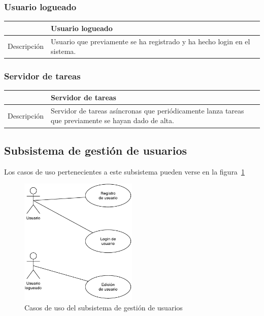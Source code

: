 \subsubsection{Usuario logueado}

\begin{center}
  \centering
  \begin{tabularx}{\textwidth}{|c|X|}
    \hline
     & Usuario logueado \\

    \hline

    Descripción & Usuario que previamente se ha registrado y ha hecho login en el sistema. \\

    \hline
  \end{tabularx}
\end{center}

\subsubsection{Servidor de tareas}

\begin{center}
  \centering
  \begin{tabularx}{\textwidth}{|c|X|}
    \hline
     & Servidor de tareas \\

    \hline

    Descripción & Servidor de tareas asíncronas que periódicamente lanza tareas que previamente se hayan dado de alta. \\

    \hline
  \end{tabularx}
\end{center}

\subsection{Subsistema de gestión de usuarios}

Los casos de uso pertenecientes a este subsistema pueden verse en la
figura~\ref{fig:subsistema-usuarios}

\begin{figure}[hp]
  \centering
  \includegraphics[width=0.5\textwidth]{4_analisis/diagrama_subsistema_gestion_usuarios}
  \caption{Casos de uso del subsistema de gestión de usuarios}
  \label{fig:subsistema-usuarios}
\end{figure}

